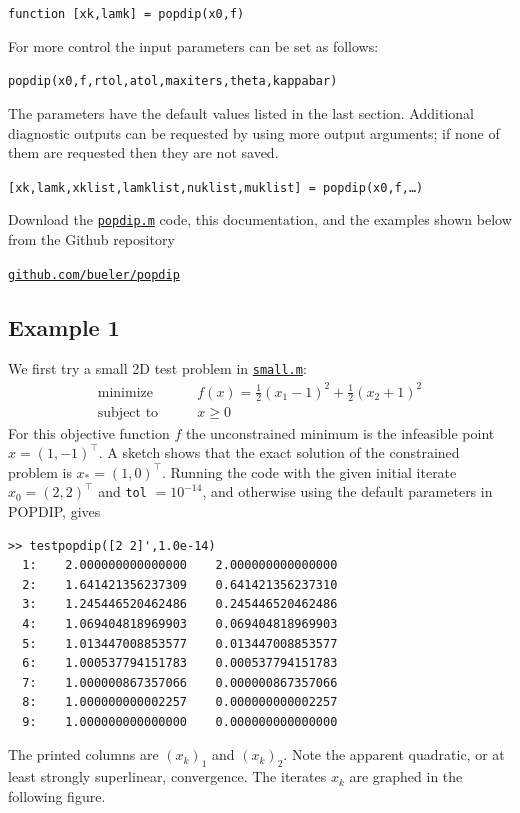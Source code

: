 \documentclass[11pt]{article}
\begin{document}
\medskip
\centerline{\texttt{function [xk,lamk] = popdip(x0,f)}}

\medskip
\noindent For more control the input parameters can be set as follows:

\medskip
\centerline{\texttt{popdip(x0,f,rtol,atol,maxiters,theta,kappabar)}}

\medskip
\noindent The parameters have the default values listed in the last section.  Additional diagnostic outputs can be requested by using more output arguments; if none of them are requested then they are not saved.

\medskip
\centerline{\texttt{[xk,lamk,xklist,lamklist,nuklist,muklist] = popdip(x0,f,\dots)}}

\medskip
\noindent Download the \href{https://github.com/bueler/popdip/blob/main/matlab/popdip.m}{\texttt{popdip.m}} code, this documentation, and the examples shown below from the Github repository
\begin{center}
    \href{https://github.com/bueler/popdip}{\texttt{github.com/bueler/popdip}}
\end{center}


\subsection*{Example 1}

We first try a small 2D test problem in \href{https://github.com/bueler/popdip/blob/main/matlab/small.m}{\texttt{small.m}}:
\begin{equation}
\begin{matrix}
\text{minimize} \qquad & f(x) = \frac{1}{2} (x_1-1)^2 + \frac{1}{2} (x_2+1)^2 \\
\text{subject to} \qquad & x \ge 0
\end{matrix} \label{testoneproblem}
\end{equation}
For this objective function $f$ the unconstrained minimum is the infeasible point $\hat x =(1,-1)^\top$.  A sketch shows that the exact solution of the constrained problem is $x_*=(1,0)^\top$.  Running the code with the given initial iterate $x_0=(2,2)^\top$ and \texttt{tol} $=10^{-14}$, and otherwise using the default parameters in POPDIP, gives
\begin{Verbatim}[fontsize=\small]
>> testpopdip([2 2]',1.0e-14)
  1:    2.000000000000000    2.000000000000000
  2:    1.641421356237309    0.641421356237310
  3:    1.245446520462486    0.245446520462486
  4:    1.069404818969903    0.069404818969903
  5:    1.013447008853577    0.013447008853577
  6:    1.000537794151783    0.000537794151783
  7:    1.000000867357066    0.000000867357066
  8:    1.000000000002257    0.000000000002257
  9:    1.000000000000000    0.000000000000000
\end{Verbatim}
The printed columns are $(x_k)_1$ and $(x_k)_2$.  Note the apparent quadratic, or at least strongly superlinear, convergence.  The iterates $x_k$ are graphed in the following figure.
\end{document}
